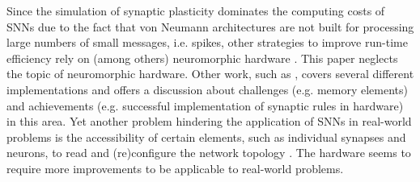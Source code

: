Since the simulation of synaptic plasticity dominates the computing costs of \acp{SNN} due to the fact that von Neumann architectures are not built 
for processing large numbers of small messages, i.e. spikes, 
other strategies to improve run-time efficiency rely on (among others) neuromorphic hardware \cite{simulation_STDP}.
This paper neglects the topic of neuromorphic hardware.
Other work, such as \cite{Synaptic_plasticity}, 
covers several different implementations and offers a discussion about challenges (e.g. memory elements) and achievements 
(e.g. successful implementation of synaptic rules in hardware) in this area.
Yet another problem hindering the application of \acp{SNN} in real-world problems is the accessibility of certain elements, such as individual synapses and neurons, 
to read and (re)configure the network topology \cite{hardware_STDP}.
The hardware seems to require more improvements to be applicable to real-world problems.